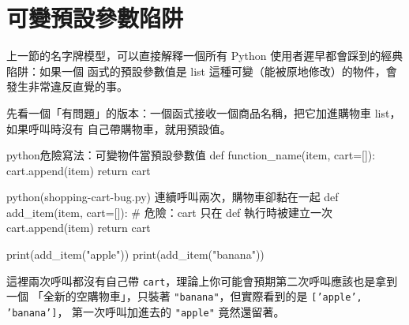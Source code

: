 \begin{center}
\end{center}


\section{可變預設參數陷阱}
\label{sec:mutable-default}

上一節的名字牌模型，可以直接解釋一個所有 Python 使用者遲早都會踩到的經典陷阱：如果一個
函式的預設參數值是 list 這種可變（能被原地修改）的物件，會發生非常違反直覺的事。

先看一個「有問題」的版本：一個函式接收一個商品名稱，把它加進購物車 list，如果呼叫時沒有
自己帶購物車，就用預設值。

\begin{code}{python}{危險寫法：可變物件當預設參數值}
def function_name(item, cart=[]):
    cart.append(item)
    return cart
\end{code}

\begin{example}{python}{(shopping-cart-bug.py) 連續呼叫兩次，購物車卻黏在一起}
def add_item(item, cart=[]):      # 危險：cart 只在 def 執行時被建立一次
    cart.append(item)
    return cart


print(add_item("apple"))
print(add_item("banana"))
\end{example}


這裡兩次呼叫都沒有自己帶 \texttt{cart}，理論上你可能會預期第二次呼叫應該也是拿到一個
「全新的空購物車」，只裝著 \texttt{"banana"}，但實際看到的是 \texttt{['apple', 'banana']}，
第一次呼叫加進去的 \texttt{"apple"} 竟然還留著。

